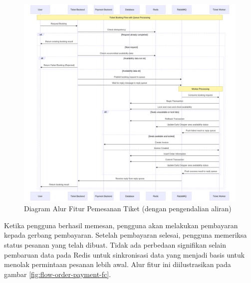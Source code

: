 \begin{figure}[h]
    \centering
    \includegraphics[width=1\textwidth]{resources/chapter-3/book-async.png}
    \caption{Diagram Alur Fitur Pemesanan Tiket (dengan pengendalian aliran)}
    \label{fig:flow-book-fc}
\end{figure}

\pagebreak

Ketika pengguna berhasil memesan, pengguna akan melakukan pembayaran kepada gerbang pembayaran. Setelah pembayaran selesai, pengguna memeriksa status pesanan yang telah dibuat. Tidak ada perbedaan signifikan selain pembaruan data pada Redis untuk sinkronisasi data yang menjadi basis untuk menolak permintaan pesanan lebih awal. Alur fitur ini diilustrasikan pada gambar \ref{fig:flow-order-payment-fc}.

